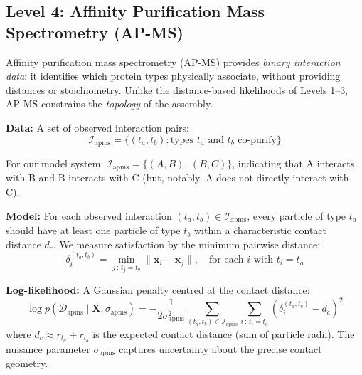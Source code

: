 \documentclass[11pt,a4paper]{article}
\newcommand{\bx}{\mathbf{x}}
\newcommand{\bX}{\mathbf{X}}
\theoremstyle{definition}
\begin{document}
\subsection{Level 4: Affinity Purification Mass Spectrometry (AP-MS)}
\label{sec:apms_data}

Affinity purification mass spectrometry (AP-MS) provides \textit{binary interaction data}: it identifies which protein types physically associate, without providing distances or stoichiometry. Unlike the distance-based likelihoods of Levels 1--3, AP-MS constrains the \textit{topology} of the assembly.

\textbf{Data:} A set of observed interaction pairs:
\begin{equation}
    \mathcal{I}_{\text{apms}} = \{(t_a, t_b) : \text{types } t_a \text{ and } t_b \text{ co-purify}\}
\end{equation}

For our model system: $\mathcal{I}_{\text{apms}} = \{(A, B),\, (B, C)\}$, indicating that A interacts with B and B interacts with C (but, notably, A does not directly interact with C).

\textbf{Model:} For each observed interaction $(t_a, t_b) \in \mathcal{I}_{\text{apms}}$, every particle of type $t_a$ should have at least one particle of type $t_b$ within a characteristic contact distance $d_c$. We measure satisfaction by the minimum pairwise distance:
\begin{equation}
    \delta_i^{(t_a, t_b)} = \min_{j \,:\, t_j = t_b} \|\bx_i - \bx_j\|, \quad \text{for each } i \text{ with } t_i = t_a
\end{equation}

\textbf{Log-likelihood:} A Gaussian penalty centred at the contact distance:
\begin{equation}
    \log p(\mathcal{D}_{\text{apms}} \mid \bX, \sigma_{\text{apms}}) = -\frac{1}{2\sigma_{\text{apms}}^2} \sum_{(t_a, t_b) \in \mathcal{I}_{\text{apms}}} \sum_{i \,:\, t_i = t_a} \left(\delta_i^{(t_a, t_b)} - d_c\right)^2
    \label{eq:apms_lik}
\end{equation}
where $d_c \approx r_{t_a} + r_{t_b}$ is the expected contact distance (sum of particle radii). The nuisance parameter $\sigma_{\text{apms}}$ captures uncertainty about the precise contact geometry.
\end{document}

